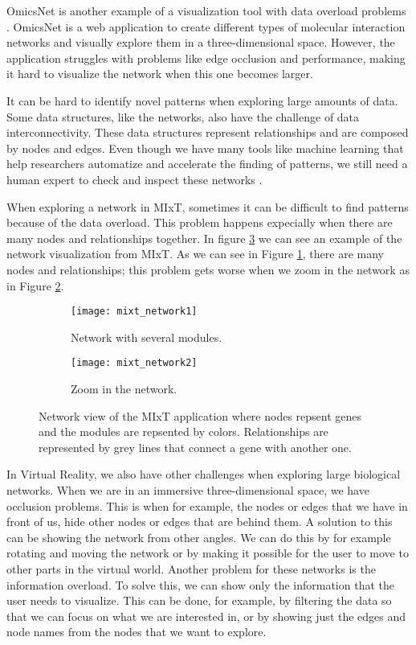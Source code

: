 OmicsNet is another example of a visualization tool with data overload problems \cite{omnicsnet}. OmicsNet is a web application to create different types of molecular interaction networks and visually explore them in a three-dimensional space. However, the application struggles with problems like edge occlusion and performance, making it hard to visualize the network when this one becomes larger.

It can be hard to identify novel patterns when exploring large amounts of data. Some data structures, like the networks, also have the challenge of data interconnectivity. These data structures represent relationships and are composed by nodes and edges. Even though we have many tools like machine learning that help researchers automatize and accelerate the finding of patterns, we still need a human expert to check and inspect these networks \cite{network_expert}.

When exploring a network in MIxT, sometimes it can be difficult to find patterns because of the data overload. This problem happens expecially when there are many nodes and relationships together. In figure \ref{fig:mixt_network} we can see an example of the network visualization from MIxT. As we can see in Figure \ref{fig:mixt_network1}, there are many nodes and relationships; this problem gets worse when we zoom in the network as in Figure \ref{fig:mixt_network_zoom}.

\begin{figure}[h!]
    \centering%
    \begin{subfigure}[t]{0.5\textwidth}
        \centering%
        \texttt{[image: mixt\_network1]}
        \caption{Network with several modules.}
        \label{fig:mixt_network1}
    \end{subfigure}%
    \begin{subfigure}[t]{0.5\textwidth}
        \centering%
        \texttt{[image: mixt\_network2]}
        \caption{Zoom in the network.}
        \label{fig:mixt_network_zoom}
    \end{subfigure}

    \caption{Network view of the MIxT application where nodes repsent genes and the modules are repsented by colors. Relationships are represented by grey lines that connect a gene with another one.}
    \label{fig:mixt_network}
\end{figure}

In Virtual Reality, we also have other challenges when exploring large biological networks. When we are in an immersive three-dimensional space, we have occlusion problems. This is when for example, the nodes or edges that we have in front of us, hide other nodes or edges that are behind them. A solution to this can be showing the network from other angles. We can do this by for example rotating and moving the network or by making it possible for the user to move to other parts in the virtual world. Another problem for these networks is the information overload. To solve this, we can show only the information that the user needs to visualize. This can be done, for example, by filtering the data so that we can focus on what we are interested in, or by showing just the edges and node names from the nodes that we want to explore.

